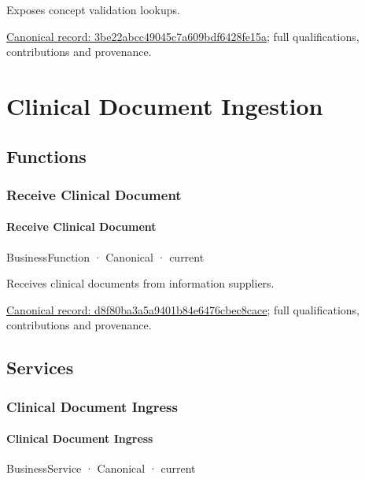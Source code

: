Exposes concept validation lookups.


{\footnotesize \href{../../../../continuum/business/business-service/3be22abcc49045c7a609bdf6428fe15a.md}{Canonical record: 3be22abcc49045c7a609bdf6428fe15a}; full qualifications, contributions and provenance.}\par
\section{Clinical Document Ingestion}

\subsection{Functions}

\subsubsection{Receive Clinical Document}

\paragraph{Receive Clinical Document}

\label{element:d8f80ba3a5a9401b84e6476cbec8cace}
{\small BusinessFunction · Canonical · current}\par

Receives clinical documents from information suppliers.


{\footnotesize \href{../../../../continuum/business/business-function/d8f80ba3a5a9401b84e6476cbec8cace.md}{Canonical record: d8f80ba3a5a9401b84e6476cbec8cace}; full qualifications, contributions and provenance.}\par
\subsection{Services}

\subsubsection{Clinical Document Ingress}

\paragraph{Clinical Document Ingress}

\label{element:2a69a33c93954a868249270d919dabfd}
{\small BusinessService · Canonical · current}\par

